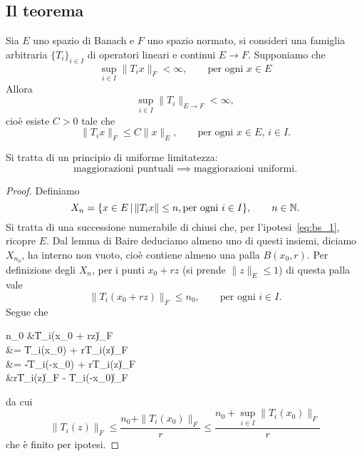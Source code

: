 \subsection{Il teorema}
\begin{theorem}
	Sia $E$ uno spazio di Banach e $F$ uno spazio normato, si consideri una famiglia arbitraria $\{T_i\}_{i \in I}$ di operatori lineari e continui $E \to F$.
	Supponiamo che
	\begin{equation}
	\label{eq:bs_1}
		\sup_{i \in I}\|T_ix\|_F < \infty, \qquad \text{per ogni $x \in E$}
	\end{equation}
	Allora
	\begin{equation*}
		\sup_{i \in I} \|T_i\|_{E \to F} < \infty,
	\end{equation*}
	cioè esiste $C > 0$ tale che
	\begin{equation*}
		\|T_i x\|_F \leq C\|x\|_E, \qquad \text{per ogni $x \in E$, $i \in I$}.
	\end{equation*}
\end{theorem}
\begin{remark}
	Si tratta di un principio di uniforme limitatezza:
	\begin{equation*}
		\text{maggiorazioni puntuali} \implies \text{maggiorazioni uniformi}.
	\end{equation*}
\end{remark}
\begin{proof}
	Definiamo
	\begin{equation*}
		X_n = \{ x\in E \,|\, \|T_ix\| \leq n, \text{per ogni $i \in I$}\}, \qquad n \in \mathbb{N}.
	\end{equation*}
	Si tratta di una successione numerabile di chiusi che, per l'ipotesi~\eqref{eq:bs_1}, ricopre $E$. Dal lemma di Baire deduciamo almeno uno di questi insiemi, diciamo $X_{n_0}$, ha interno non vuoto, cioè contiene almeno una palla $B(x_0, r)$.
	Per definizione degli $X_n$, per i punti $x_0 + rz$ (si prende $\|z\|_E \leq 1$) di questa palla vale
	\begin{equation*}
		\|T_i(x_0 + rz)\|_F \leq n_0, \qquad \text{per ogni $i \in I$}.
	\end{equation*}
	Segue che
	\begin{eqalign*}
		n_0 &\geq \|T_i(x_0 + rz)\|_F\\
		&= \|T_i(x_0) + rT_i(z)\|_F\\
		&= \|-T_i(-x_0) + rT_i(z)\|_F\\
		&\geq r\|T_i(z)\|_F - \|T_i(-x_0)\|_F
	\end{eqalign*}
	da cui
	\begin{equation*}
		\|T_i(z)\|_F \leq \frac{n_0 + \|T_i(x_0)\|_F}{r} \leq \frac{n_0 +\sup_{i \in I} \|T_i(x_0)\|_F}{r}
	\end{equation*}
	che è finito per ipotesi.
\end{proof}

